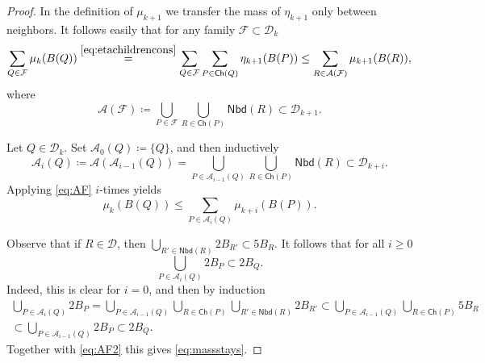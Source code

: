 \documentclass[10pt,a4paper]{amsart}
\def\dA{{\mathcal{A}}}
\def\dF{{\mathcal{F}}}
\newcommand{\Child}{\mathsf{Ch}}
\newcommand{\DD}{\mathcal{D}}
\newcommand{\Nei}{\mathsf{Nbd}}
\begin{document}
\begin{proof}
	In the definition of $\mu_{k+1}$ we transfer the mass of $\eta_{k+1}$ only between neighbors. It follows easily that for any family $\dF\subset\DD_k$
	\begin{equation}\label{eq:AF}
	\sum_{Q\in\dF}\mu_{k}(B(Q)) \overset{\eqref{eq:etachildrencons}}{=} \sum_{Q\in\dF}\sum_{P\in\Child(Q)}\eta_{k+1}(B(P))\le \sum_{R\in\mathcal{A}(\dF)}\mu_{k+1}(B(R)),
	\end{equation}
	where
	\begin{equation*}
	\mathcal{A}(\dF)\coloneqq \bigcup_{P\in\mathcal{F}}\bigcup_{R\in\Child(P)}\Nei(R)\subset\DD_{k+1}.
	\end{equation*}
	
	Let $Q\in\DD_k$. Set $\mathcal{A}_0(Q)\coloneqq\{Q\}$, and then inductively
	\begin{equation*}
	\mathcal{A}_i(Q) \coloneqq \mathcal{A}(\mathcal{A}_{i-1}(Q))= \bigcup_{P\in\mathcal{A}_{i-1}(Q)}\bigcup_{R\in\Child(P)}\Nei(R)\subset \DD_{k+i}.
	\end{equation*}
	Applying \eqref{eq:AF} $i$-times yields
	\begin{equation}\label{eq:AF2}
	\mu_k(B(Q))\le \sum_{P\in\dA_i(Q)}\mu_{k+i}(B(P)).
	\end{equation}
	
	Observe that if $R\in\DD$, then $\bigcup_{R'\in \Nei(R)}2B_{R'} \subset 5B_R$. It follows that for all $i\ge 0$
	\begin{equation*}
	\bigcup_{P\in\dA_i(Q)}2B_P \subset 2B_Q.
	\end{equation*}
	Indeed, this is clear for $i=0$, and then by induction
	\begin{multline*}
	\bigcup_{P\in\dA_i(Q)}2B_P = \bigcup_{P\in\mathcal{A}_{i-1}(Q)}\bigcup_{R\in\Child(P)}\bigcup_{R'\in \Nei(R)}2B_{R'} \subset \bigcup_{P\in\mathcal{A}_{i-1}(Q)}\bigcup_{R\in\Child(P)} 5B_R\\
	\subset \bigcup_{P\in\mathcal{A}_{i-1}(Q)} 2B_P \subset 2B_Q.
	\end{multline*}
	Together with \eqref{eq:AF2} this gives \eqref{eq:massstays}.
	

\end{proof}
\end{document}
